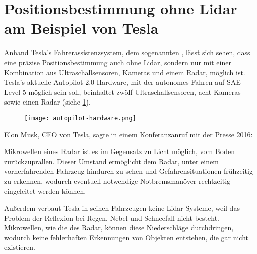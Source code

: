 \section{Positionsbestimmung ohne Lidar am Beispiel von Tesla}\label{section-2-3}

Anhand Tesla's Fahrerassistenzsystem, dem sogenannten , lässt sich sehen, dass eine präzise Positionsbestimmung auch ohne \acs{Lidar}, sondern nur mit einer Kombination aus Ultraschallsensoren, Kameras und einem \acs{Radar}, möglich ist. Tesla's aktuelle Autopilot 2.0 Hardware, mit der autonomes Fahren auf \ac{SAE}-Level 5 möglich sein soll, beinhaltet zwölf Ultraschallsensoren, acht Kameras sowie einen \acs{Radar} (siehe \ref{autopilot-hardware}).

\begin{figure}\centering
  \texttt{[image: autopilot-hardware.png]}
  \label{autopilot-hardware}
\end{figure}

\noindent Elon Musk, CEO von Tesla, sagte in einem Konferanzanruf mit der Presse 2016: 

Mikrowellen eines \acs{Radar} ist es im Gegensatz zu Licht möglich, vom Boden zurückzuprallen. Dieser Umstand ermöglicht dem \acs{Radar}, unter einem vorherfahrenden Fahrzeug hindurch zu sehen und Gefahrensituationen frühzeitig zu erkennen, wodurch eventuell notwendige Notbremsmanöver rechtzeitig eingeleitet werden können. 

Außerdem verbaut Tesla in seinen Fahrzeugen keine \acs{Lidar}-Systeme, weil das Problem der Reflexion bei Regen, Nebel und Schneefall nicht besteht. Mikrowellen, wie die des \acs{Radar}, können diese Niederschläge durchdringen, wodurch keine fehlerhaften Erkennungen von Objekten entstehen, die gar nicht existieren. 

